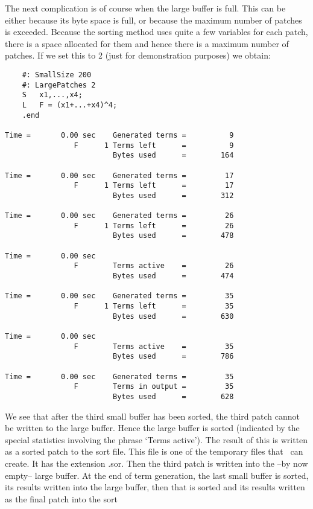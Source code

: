 The next complication is of course when the large buffer is full. This can 
be either because its byte space is full, or because the maximum number of 
patches is exceeded. Because the sorting method uses quite a few variables 
for each patch, there is a space allocated for them and hence there is a 
maximum number of patches. If we set this to 2 (just for demonstration 
purposes) we obtain:
\begin{verbatim}
    #: SmallSize 200
    #: LargePatches 2
    S	x1,...,x4;
    L	F = (x1+...+x4)^4;
    .end

Time =       0.00 sec    Generated terms =          9
                F      1 Terms left      =          9
                         Bytes used      =        164

Time =       0.00 sec    Generated terms =         17
                F      1 Terms left      =         17
                         Bytes used      =        312

Time =       0.00 sec    Generated terms =         26
                F      1 Terms left      =         26
                         Bytes used      =        478

Time =       0.00 sec
                F        Terms active    =         26
                         Bytes used      =        474

Time =       0.00 sec    Generated terms =         35
                F      1 Terms left      =         35
                         Bytes used      =        630

Time =       0.00 sec
                F        Terms active    =         35
                         Bytes used      =        786

Time =       0.00 sec    Generated terms =         35
                F        Terms in output =         35
                         Bytes used      =        628
\end{verbatim}
We see that after the third small buffer has been sorted, the third patch 
cannot be written to the large buffer. Hence the large buffer is sorted 
(indicated by the special statistics involving the phrase `Terms active'). 
The result of this is written as a sorted patch to the
sort file. This file is one of the 
temporary files that \FORM\ can create. It has the 
extension .sor. Then the third patch is written into 
the --by now empty-- large buffer. At the end of term generation, the last 
small buffer is sorted, its results written into the large buffer, then 
that is sorted and its results written as the final patch into the sort 
